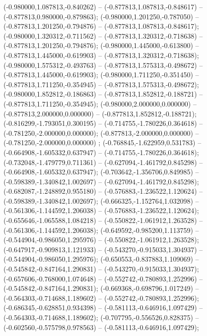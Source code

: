  (-0.980000,1.087813,-0.840262) -- (-0.877813,1.087813,-0.848617) -- (-0.877813,0.980000,-0.879863);
 (-0.980000,1.201250,-0.787050) -- (-0.877813,1.201250,-0.794876) -- (-0.877813,1.087813,-0.848617);
 (-0.980000,1.320312,-0.711562) -- (-0.877813,1.320312,-0.718638) -- (-0.877813,1.201250,-0.794876);
 (-0.980000,1.445000,-0.613800) -- (-0.877813,1.445000,-0.619903) -- (-0.877813,1.320312,-0.718638);
 (-0.980000,1.575312,-0.493763) -- (-0.877813,1.575313,-0.498672) -- (-0.877813,1.445000,-0.619903);
 (-0.980000,1.711250,-0.351450) -- (-0.877813,1.711250,-0.354945) -- (-0.877813,1.575313,-0.498672);
 (-0.980000,1.852812,-0.186863) -- (-0.877813,1.852812,-0.188721) -- (-0.877813,1.711250,-0.354945);
 (-0.980000,2.000000,0.000000) -- (-0.877813,2.000000,0.000000) -- (-0.877813,1.852812,-0.188721);
 (-0.816299,-1.793051,0.300195) -- (-0.714755,-1.780226,0.364618) -- (-0.781250,-2.000000,0.000000);
 (-0.877813,-2.000000,0.000000) -- (-0.781250,-2.000000,0.000000) ;
 (-0.768845,-1.622959,0.531783) -- (-0.664908,-1.605332,0.637947) -- (-0.714755,-1.780226,0.364618);
 (-0.732048,-1.479779,0.711361) -- (-0.627094,-1.461792,0.845298) -- (-0.664908,-1.605332,0.637947);
 (-0.703642,-1.356706,0.849985) -- (-0.598389,-1.340842,1.002697) -- (-0.627094,-1.461792,0.845298);
 (-0.682087,-1.248892,0.955180) -- (-0.576883,-1.236522,1.120624) -- (-0.598389,-1.340842,1.002697);
 (-0.666325,-1.152764,1.032098) -- (-0.561306,-1.144592,1.206038) -- (-0.576883,-1.236522,1.120624);
 (-0.655646,-1.065588,1.084218) -- (-0.550822,-1.061912,1.263528) -- (-0.561306,-1.144592,1.206038);
 (-0.649592,-0.985200,1.113759) -- (-0.544904,-0.986050,1.295976) -- (-0.550822,-1.061912,1.263528);
 (-0.647917,-0.909813,1.121933) -- (-0.543270,-0.915033,1.304937) -- (-0.544904,-0.986050,1.295976);
 (-0.650553,-0.837883,1.109069) -- (-0.545842,-0.847164,1.290831) -- (-0.543270,-0.915033,1.304937);
 (-0.657606,-0.768000,1.074648) -- (-0.552742,-0.780893,1.252996) -- (-0.545842,-0.847164,1.290831);
 (-0.669368,-0.698796,1.017249) -- (-0.564303,-0.714688,1.189602) -- (-0.552742,-0.780893,1.252996);
 (-0.686345,-0.628851,0.934398) -- (-0.581113,-0.646916,1.097429) -- (-0.564303,-0.714688,1.189602);
 (-0.707795,-0.556526,0.828375) -- (-0.602560,-0.575798,0.978563) -- (-0.581113,-0.646916,1.097429);
